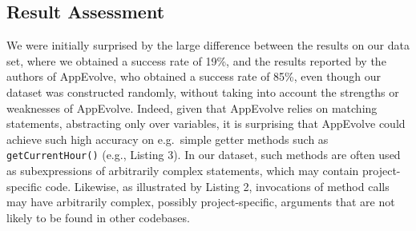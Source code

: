 %
%
%

\subsection{Result Assessment}

We were initially surprised by the large difference between the results on
our data set, where we obtained a success rate of 19\%, and the results
reported by the authors of AppEvolve, who obtained a success rate of
85\%, even though our dataset was constructed randomly, without taking
into account the strengths or weaknesses of AppEvolve.  Indeed, given that
AppEvolve relies on matching statements, abstracting only over variables,
it is surprising that AppEvolve could achieve such high accuracy on
e.g.\ simple getter methods such as {\tt getCurrentHour()} (e.g., Listing
3). In our dataset, such methods are often used as subexpressions of
arbitrarily complex statements, which may contain project-specific code.
Likewise, as illustrated by Listing 2, invocations of method calls may have
arbitrarily complex, possibly project-specific, arguments that are not
likely to be found in other codebases.

